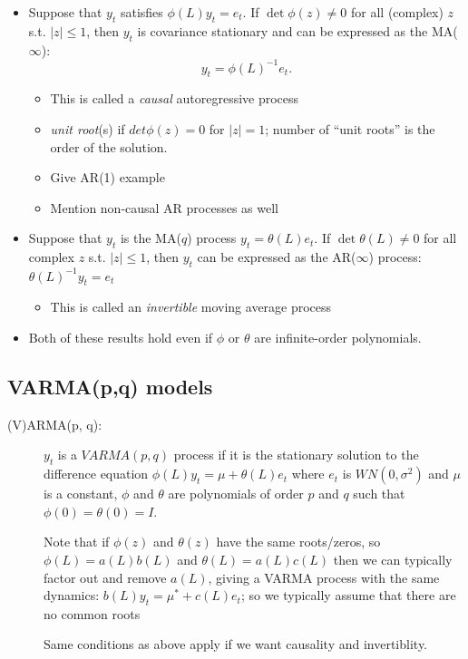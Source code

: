 \begin{itemize}
\item Suppose that $y_t$ satisfies $\phi(L) y_t = e_t$. If $\det \phi(z) \neq 0$
  for all (complex) $z$ s.t. $|z| \leq 1$, then $y_t$ is covariance
  stationary and can be expressed as the MA($\infty$):
  \[y_t = \phi(L)^{-1} e_t.\]
  \begin{itemize}
  \item This is called a \emph{causal} autoregressive process
  \item \emph{unit root}(s) if $det \phi(z) = 0$ for $|z| = 1$; number of
    ``unit roots'' is the order of the solution.
  \item Give AR(1) example
  \item Mention non-causal AR processes as well
  \end{itemize}
\item Suppose that $y_t$ is the MA($q$) process $y_t = \theta(L) e_t$. If
  $\det \theta(L) \neq 0$ for all complex $z$ s.t. $|z| \leq 1$, then $y_t$ can be
  expressed as the AR($\infty$) process: $\theta(L)^{-1} y_t = e_t$

  \begin{itemize}
  \item This is called an \emph{invertible} moving average process
  \end{itemize}
\item Both of these results hold even if $\phi$ or $\theta$ are infinite-order
  polynomials.
\end{itemize}

\subsection{VARMA(p,q) models}

\begin{description}
\item[(V)ARMA(p, q):] $y_t$ is a $VARMA(p,q)$ process if it is the
  stationary solution to the difference equation $\phi(L) y_t = \mu + \theta(L)
  e_t$ where $e_t$ is $WN(0, \sigma^2)$ and $\mu$ is a constant, $\phi$ and $\theta$
  are polynomials of order $p$ and $q$ such that $\phi(0) = \theta(0) = I$.

  Note that if $\phi(z)$ and $\theta(z)$ have the same roots/zeros, so $\phi(L) =
  a(L) b(L)$ and $\theta(L) = a(L) c(L)$ then we can typically factor out
  and remove $a(L)$, giving a VARMA process with the same dynamics:
  $b(L) y_t = \mu^* + c(L) e_t$; so we typically assume that there are
  no common roots

  Same conditions as above apply if we want causality and
  invertiblity.
\end{description}

